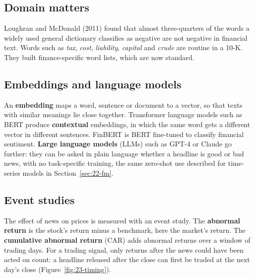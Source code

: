 \subsection{Domain matters}

Loughran and McDonald (2011) found that almost three-quarters of the words a widely used general dictionary classifies as negative are not negative in financial text. Words such as \emph{tax}, \emph{cost}, \emph{liability}, \emph{capital} and \emph{crude} are routine in a 10-K. They built finance-specific word lists, which are now standard.

\subsection{Embeddings and language models}

An \textbf{embedding} maps a word, sentence or document to a vector, so that texts with similar meanings lie close together. Transformer language models such as BERT produce \textbf{contextual} embeddings, in which the same word gets a different vector in different sentences. FinBERT is BERT fine-tuned to classify financial sentiment. \textbf{Large language models} (LLMs) such as GPT-4 or Claude go further: they can be asked in plain language whether a headline is good or bad news, with no task-specific training, the same zero-shot use described for time-series models in Section~\ref{sec:22-fm}.

\subsection{Event studies}

The effect of news on prices is measured with an event study. The \textbf{abnormal return} is the stock's return minus a benchmark, here the market's return. The \textbf{cumulative abnormal return} (CAR) adds abnormal returns over a window of trading days. For a trading signal, only returns after the news could have been acted on count: a headline released after the close can first be traded at the next day's close (Figure~\ref{fig:23-timing}).

